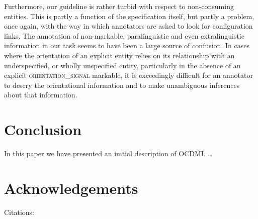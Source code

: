 \documentclass[11pt]{article}
\begin{document}
Furthermore, our guideline is rather turbid with respect to non-consuming entities. This is partly a function of the specification itself, but partly a problem, once again, with the way in which annotators are asked to look for configuration links. The annotation of non-markable, paralinguistic and even extralinguistic information in our task seems to have been a large source of confusion. In cases where the orientation of an explicit entity relies on its relationship with an underspecified, or wholly unspecified entity, particularly in the absence of an explicit \textsc{orientation\_signal} markable, it is exceedingly difficult for an annotator to descry the orientational information and to make unambiguous inferences about that information.



\section{Conclusion} %
\label{sec:conclusion}
In this paper we have presented an initial description of OCDML \ldots

\section*{Acknowledgements} %
\label{sec:acknowledgements}

Citations:
\cite{cohn1997qualitative}
\cite{isli2000new}
\cite{cristani2002spaceml}
\cite{slobin2001sign}
\cite{mani2010spatialml}
\cite{talmy1978figure}
\cite{herskovits1980spatial}
\cite{stubbs2011mae}
\cite{joachims1998text}




\end{document}
